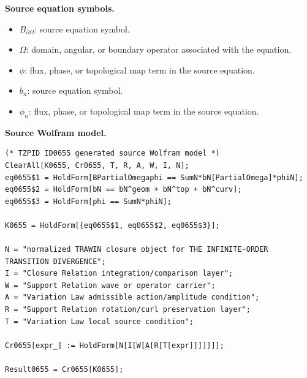 \begin{minipage}[t]{0.49\linewidth}
\begingroup
\small
\raggedright
\textbf{Source equation symbols.}\par
\begin{itemize}[leftmargin=1.35em,itemsep=1pt,topsep=1pt,parsep=0pt]
    \item $B_{\partial\Omega}$: source equation symbol.
    \item $\Omega$: domain, angular, or boundary operator associated with the equation.
    \item $\phi$: flux, phase, or topological map term in the source equation.
    \item $b_n$: source equation symbol.
    \item $\phi_n$: flux, phase, or topological map term in the source equation.
\end{itemize}
\endgroup
\end{minipage}\hfill
\begin{minipage}[t]{0.47\linewidth}
\begingroup
\scriptsize
\raggedright
\textbf{Source Wolfram model.}\par
\begin{Verbatim}[fontsize=\tiny,breaklines=true,breakanywhere=true]
(* TZPID ID0655 generated source Wolfram model *)
ClearAll[K0655, Cr0655, T, R, A, W, I, N];
eq0655$1 = HoldForm[BPartialOmegaphi == SumN*bN[PartialOmega]*phiN];
eq0655$2 = HoldForm[bN == bN^geom + bN^top + bN^curv];
eq0655$3 = HoldForm[phi == SumN*phiN];

K0655 = HoldForm[{eq0655$1, eq0655$2, eq0655$3}];

N = "normalized TRAWIN closure object for THE INFINITE-ORDER TRANSITION DIVERGENCE";
I = "Closure Relation integration/comparison layer";
W = "Support Relation wave or operator carrier";
A = "Variation Law admissible action/amplitude condition";
R = "Support Relation rotation/curl preservation layer";
T = "Variation Law local source condition";

Cr0655[expr_] := HoldForm[N[I[W[A[R[T[expr]]]]]]];

Result0655 = Cr0655[K0655];
\end{Verbatim}
\endgroup
\end{minipage}

